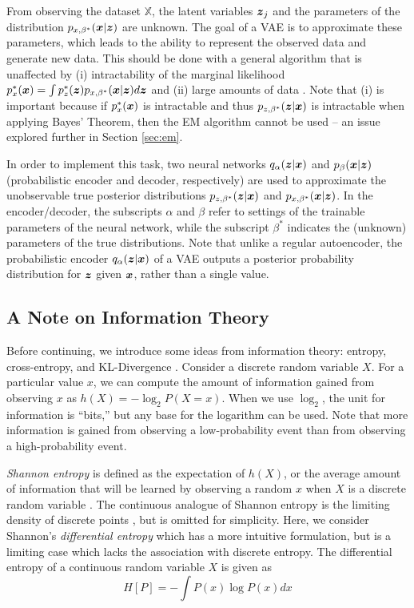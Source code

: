 From observing the dataset $\mathbb{X}$, the latent variables $\boldsymbol{z}_j$ and the parameters of the distribution $p_{x,\beta^*}(\boldsymbol{x} | \boldsymbol{z})$ are unknown. The goal of a VAE is to approximate these parameters, which leads to the ability to represent the observed data and generate new data. This should be done with a general algorithm that is unaffected by (i) intractability of the marginal likelihood $p_x^*(\boldsymbol{x}) = \int p_z^*(\boldsymbol{z}) p_{x,\beta^*}(\boldsymbol{x} | \boldsymbol{z}) d\boldsymbol{z}$ and (ii) large amounts of data \cite{kingma2014}. Note that (i) is important because if $p_x^*(\boldsymbol{x})$ is intractable and thus $p_{z,\beta^*}(\boldsymbol{z} | \boldsymbol{x})$ is intractable when applying Bayes' Theorem, then the EM algorithm cannot be used -- an issue explored further in Section \ref{sec:em}.

In order to implement this task, two neural networks $q_\alpha(\boldsymbol{z} | \boldsymbol{x})$ and $p_\beta(\boldsymbol{x} | \boldsymbol{z})$ (probabilistic encoder and decoder, respectively) are used to approximate the unobservable true posterior distributions $p_{z,\beta^*}(\boldsymbol{z}| \boldsymbol{x})$ and $p_{x,\beta^*}(\boldsymbol{x} | \boldsymbol{z})$. In the encoder/decoder, the subscripts $\alpha$ and $\beta$ refer to settings of the trainable parameters of the neural network, while the subscript $\beta^*$ indicates the (unknown) parameters of the true distributions. Note that unlike a regular autoencoder, the probabilistic encoder $q_\alpha(\boldsymbol{z} | \boldsymbol{x})$ of a VAE outputs a posterior probability distribution for $\boldsymbol{z}$ given $\boldsymbol{x}$, rather than a single value.

\subsection{A Note on Information Theory}
Before continuing, we introduce some ideas from information theory: entropy, cross-entropy, and KL-Divergence \cite{pattern_rec_book}. Consider a discrete random variable $X$. For a particular value $x$, we can compute the amount of information gained from observing $x$ as $h(X) = -\log_2 P(X=x)$. When we use $\log_2$, the unit for information is ``bits,'' but any base for the logarithm can be used. Note that more information is gained from observing a low-probability event than from observing a high-probability event. 

\textit{Shannon entropy} is defined as the expectation of $h(X)$, or the average amount of information that will be learned by observing a random $x$ when $X$ is a discrete random variable \cite{shannon1948}. The continuous analogue of Shannon entropy is the limiting density of discrete points \cite{jaynes1957}, but is omitted for simplicity. Here, we consider Shannon's \textit{differential entropy} which has a more intuitive formulation, but is a limiting case which lacks the association with discrete entropy. The differential entropy of a continuous random variable $X$ is given as 
\begin{equation}
  H[P] = - \int P(x) \log P(x)dx
  \label{eq:entropy}
\end{equation}

